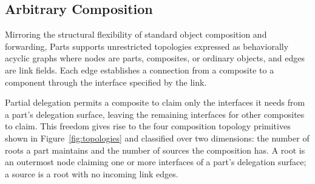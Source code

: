 \documentclass[acmsmall,nonacm]{acmart}
\theoremstyle{acmplain}
\begin{document}
\subsection{Arbitrary Composition}
\label{subsec:topologies}

Mirroring the structural flexibility of standard object composition and forwarding, Parts supports unrestricted topologies
expressed as behaviorally acyclic graphs where nodes are parts, composites, or ordinary objects, and edges are
link fields. Each edge establishes a connection from a composite to a component through the interface specified by the link.

Partial delegation permits a composite to claim only the interfaces it needs from a part's delegation surface, leaving the
remaining interfaces for other composites to claim. This freedom gives rise to the four composition topology primitives
shown in Figure~\ref{fig:topologies} and classified over two dimensions: the number of roots a part maintains and the number
of sources the composition has. A root is an outermost node claiming one or more interfaces of a part's delegation surface;
a source is a root with no incoming link edges.
\end{document}
